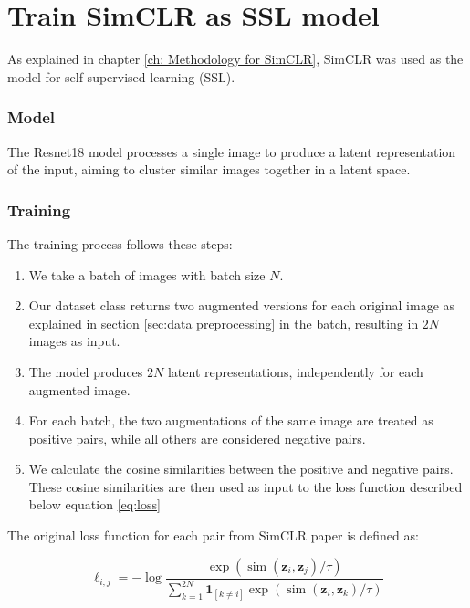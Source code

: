 \section{Train SimCLR as SSL model}

 As explained in chapter \ref{ch: Methodology for SimCLR}, SimCLR was used as the  model for self-supervised learning (SSL). 




\subsubsection{Model}
The Resnet18 \cite{he2015deepresiduallearningimage} model processes a single image to produce a latent representation of the input, aiming to cluster 
similar images together in a latent space. 

\subsubsection{Training }
The training process follows these steps:

\begin{enumerate}
    \item We take a batch of images with batch size $N$.
    
    \item Our dataset class returns two augmented versions for each original image as explained in section \ref{sec:data preprocessing} in the batch, 
    resulting in $2N$ images as input.

    \item The model produces $2N$ latent representations, independently for each augmented image.

    \item For each batch, the two augmentations of the same image are treated as positive pairs, while all others are considered negative pairs.

    \item We calculate the cosine similarities between the positive and negative pairs. These cosine similarities are then used as input to the loss
     function described below equation \ref{eq:loss}
\end{enumerate}
The original loss function for each pair from SimCLR paper \cite{chen2020simple} is defined as:

\begin{equation}
\ell_{i, j} = -\log \frac{\exp \left(\operatorname{sim}\left(\boldsymbol{z}_i, \boldsymbol{z}_j\right) / \tau\right)}{\sum_{k=1}^{2 N} \mathbf{1}_{[k \neq i]} \exp \left(\operatorname{sim}\left(\boldsymbol{z}_i, \boldsymbol{z}_k\right) / \tau\right)}
\label{eq:original}
\end{equation}


